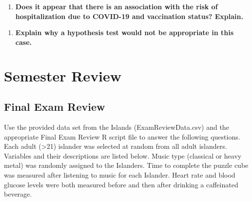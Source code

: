 \documentclass[
]{report}
\providecommand{\tightlist}{%
  \setlength{\itemsep}{0pt}\setlength{\parskip}{0pt}}
\begin{document}
\vspace{0.5in}

\begin{enumerate}
\def\labelenumi{\arabic{enumi}.}
\setcounter{enumi}{9}
\tightlist
\item
  \textbf{Does it appear that there is an association with the risk of hospitalization due to COVID-19 and vaccination status? Explain.}
\end{enumerate}

\vspace{0.5in}

\begin{enumerate}
\def\labelenumi{\arabic{enumi}.}
\setcounter{enumi}{10}
\tightlist
\item
  \textbf{Explain why a hypothesis test would not be appropriate in this case.}
\end{enumerate}

\newpage

\hypertarget{semester-review}{%
\chapter{Semester Review}\label{semester-review}}

\hypertarget{final-exam-review}{%
\section{Final Exam Review}\label{final-exam-review}}


Use the provided data set from the Islands (ExamReviewData.csv) and the appropriate Final Exam Review R script file to answer the following questions. Each adult (\textgreater21) islander was selected at random from all adult islanders. Variables and their descriptions are listed below. Music type (classical or heavy metal) was randomly assigned to the Islanders. Time to complete the puzzle cube was measured after listening to music for each Islander. Heart rate and blood glucose levels were both measured before and then after drinking a caffeinated beverage.
\end{document}
